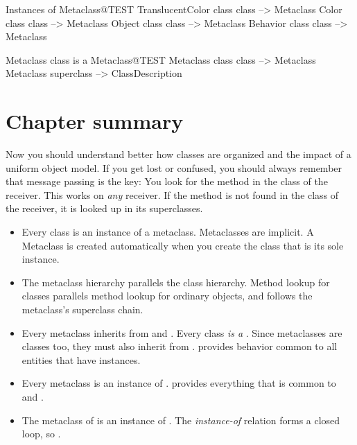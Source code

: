 \documentclass[a4paper,10pt,twoside]{book}
\begin{document}
\begin{example}{Instances of Metaclass}{@TEST}
TranslucentColor class class --> Metaclass
Color class class                   --> Metaclass
Object class class                 --> Metaclass
Behavior class class              --> Metaclass
\end{example}

\begin{example}{Metaclass class is a Metaclass}{@TEST}
Metaclass class class --> Metaclass
Metaclass superclass --> ClassDescription
\end{example}

\section{Chapter summary}
Now you should understand better how classes are organized and the impact of a uniform object model.
If you get lost or confused, you should always remember that message passing is the key:
You look for the method in the class of the receiver. 
This works on \emph{any} receiver. 
If the method is not found in the class of the receiver, it is looked up in its superclasses.

\begin{itemize}
\item Every class is an instance of a metaclass.
	Metaclasses are implicit.
	A Metaclass is created automatically when you create the class that is its sole instance.

\item The metaclass hierarchy parallels the class hierarchy.
	Method lookup for classes parallels method lookup for ordinary objects, and follows the metaclass's superclass chain.

\item Every metaclass inherits from  and .
	Every class \emph{is a} . Since metaclasses are classes too, they must also inherit from .
	 provides behavior common to all entities that have instances.

\item Every metaclass is an instance of .
	 provides everything that is common to  and .

\item The metaclass of  is an instance of .
	The \emph{instance-of} relation forms a closed loop, so .
\end{itemize}
\ifx\wholebook\relax\else
\end{document}
